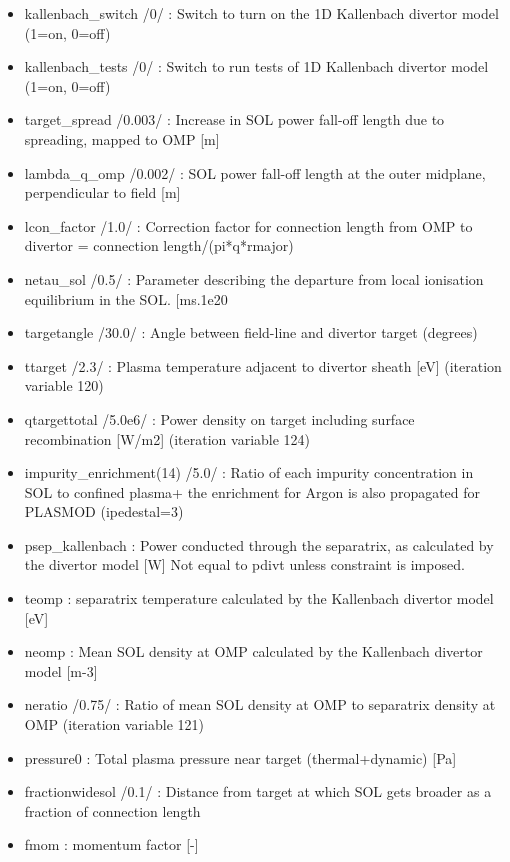 \documentclass[]{article}
\providecommand{\tightlist}{%
  \setlength{\itemsep}{0pt}\setlength{\parskip}{0pt}}
\begin{document}
\begin{itemize}
\tightlist
\item
  kallenbach\_switch /0/ : Switch to turn on the 1D Kallenbach divertor
  model (1=on, 0=off)
\item
  kallenbach\_tests /0/ : Switch to run tests of 1D Kallenbach divertor
  model (1=on, 0=off)
\item
  target\_spread /0.003/ : Increase in SOL power fall-off length due to
  spreading, mapped to OMP {[}m{]}
\item
  lambda\_q\_omp /0.002/ : SOL power fall-off length at the outer
  midplane, perpendicular to field {[}m{]}
\item
  lcon\_factor /1.0/ : Correction factor for connection length from OMP
  to divertor = connection length/(pi*q*rmajor)
\item
  netau\_sol /0.5/ : Parameter describing the departure from local
  ionisation equilibrium in the SOL. {[}ms.1e20
\item
  targetangle /30.0/ : Angle between field-line and divertor target
  (degrees)
\item
  ttarget /2.3/ : Plasma temperature adjacent to divertor sheath
  {[}eV{]} (iteration variable 120)
\item
  qtargettotal /5.0e6/ : Power density on target including surface
  recombination {[}W/m2{]} (iteration variable 124)
\item
  impurity\_enrichment(14) /5.0/ : Ratio of each impurity concentration
  in SOL to confined plasma+ the enrichment for Argon is also propagated
  for PLASMOD (ipedestal=3)
\item
  psep\_kallenbach : Power conducted through the separatrix, as
  calculated by the divertor model {[}W{]} Not equal to pdivt unless
  constraint is imposed.
\item
  teomp : separatrix temperature calculated by the Kallenbach divertor
  model {[}eV{]}
\item
  neomp : Mean SOL density at OMP calculated by the Kallenbach divertor
  model {[}m-3{]}
\item
  neratio /0.75/ : Ratio of mean SOL density at OMP to separatrix
  density at OMP (iteration variable 121)
\item
  pressure0 : Total plasma pressure near target (thermal+dynamic)
  {[}Pa{]}
\item
  fractionwidesol /0.1/ : Distance from target at which SOL gets broader
  as a fraction of connection length
\item
  fmom : momentum factor {[}-{]}

\end{itemize}
\end{document}
